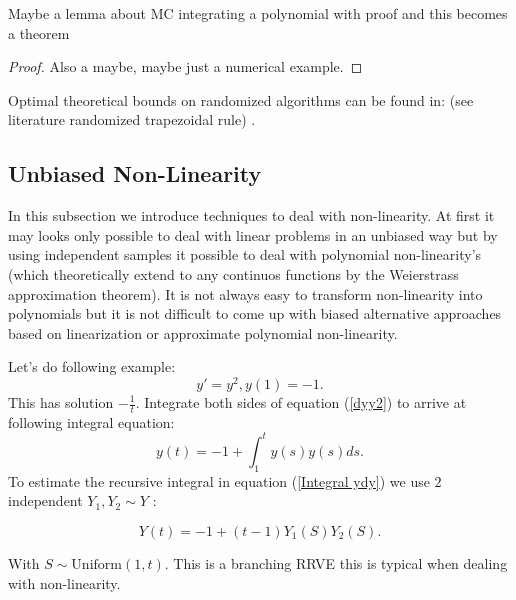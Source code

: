 \documentclass[a4paper,12pt]{article}
\begin{document}
\begin{lemma}
    Maybe a lemma about MC integrating a polynomial
    with proof and this becomes a theorem
\end{lemma}

\begin{proof}
    Also a maybe, maybe just a numerical example.
\end{proof}

\begin{related}
    Optimal theoretical bounds on randomized algorithms can be found in:
    (see literature randomized trapezoidal rule)
    \cite{wu_randomised_2020}.
\end{related}

\subsection{Unbiased Non-Linearity}
In this subsection we introduce techniques to deal with non-linearity.
At first it may looks only possible to deal with linear problems in an unbiased way but by using
independent samples it possible to deal with polynomial non-linearity's (which theoretically extend
to any continuos functions by the Weierstrass approximation theorem).  It is not always easy to
transform non-linearity into polynomials but it is not difficult to come up with
biased alternative approaches based on linearization or approximate polynomial non-linearity.


\begin{example}[$y'=y^{2}$]
    Let's do following example:
    \begin{equation} \label{dyy2}
        y'= y^2,y(1)=-1.
    \end{equation}
    This has solution $-\frac{1}{t}$. Integrate both sides of
    equation (\ref{dyy2}) to arrive at following integral equation:
    \begin{equation} \label{Integral dyy2}
        y(t) = -1 + \int_{1}^{t} y(s) y(s) ds .
    \end{equation}
    To estimate the recursive integral in equation (\ref{Integral ydy}) we use $2$
    independent $Y_{1},Y_{2}\sim Y$ :

    \begin{equation} \label{RRVE yy2}
        Y(t) = -1 + (t-1) Y_{1}(S) Y_{2}(S).
    \end{equation}

    With $S \sim \text{Uniform}(1,t)$. This is a branching RRVE this is
    typical when dealing with non-linearity.
\end{example}
\end{document}
